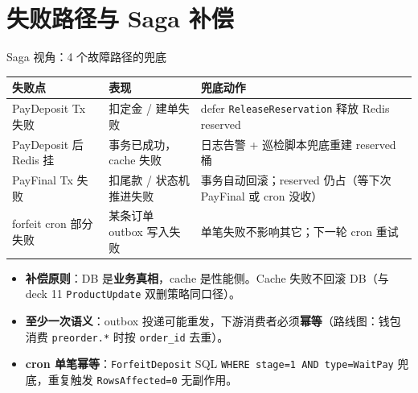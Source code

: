 \documentclass[aspectratio=169,11pt]{beamer}
\begin{document}
\section{失败路径与 Saga 补偿}

\begin{frame}[shrink]{Saga 视角：4 个故障路径的兜底}
{\footnotesize
\begin{tabular}{@{}lll@{}}
\toprule
失败点 & 表现 & 兜底动作 \\
\midrule
PayDeposit Tx 失败 & 扣定金 / 建单失败 & defer \texttt{ReleaseReservation} 释放 Redis reserved \\
PayDeposit 后 Redis 挂 & 事务已成功，cache 失败 & 日志告警 + 巡检脚本兜底重建 reserved 桶 \\
PayFinal Tx 失败 & 扣尾款 / 状态机推进失败 & 事务自动回滚；reserved 仍占（等下次 PayFinal 或 cron 没收） \\
forfeit cron 部分失败 & 某条订单 outbox 写入失败 & 单笔失败不影响其它；下一轮 cron 重试 \\
\bottomrule
\end{tabular}}
\vspace{1mm}
\begin{itemize}\small
  \item \textbf{补偿原则}：DB 是\textbf{业务真相}，cache 是性能侧。Cache 失败不回滚 DB（与 deck 11 \texttt{ProductUpdate} 双删策略同口径）。
  \item \textbf{至少一次语义}：outbox 投递可能重发，下游消费者必须\textbf{幂等}（路线图：钱包消费 \texttt{preorder.*} 时按 \texttt{order\_id} 去重）。
  \item \textbf{cron 单笔幂等}：\texttt{ForfeitDeposit} SQL \texttt{WHERE stage=1 AND type=WaitPay} 兜底，重复触发 \texttt{RowsAffected=0} 无副作用。
\end{itemize}
\end{frame}
\end{document}
